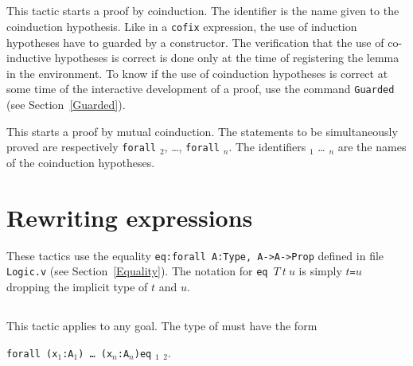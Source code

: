 \subsection{}
\label{tactic:cofix}

This tactic starts a proof by coinduction. The identifier {\ident} is
the name given to the coinduction hypothesis.  Like in a {\tt cofix}
expression, the use of induction hypotheses have to guarded by a
constructor.  The verification that the use of co-inductive hypotheses
is correct is done only at the time of registering the lemma in the
environment. To know if the use of coinduction hypotheses is correct
at some time of the interactive development of a proof, use the
command {\tt Guarded} (see Section~\ref{Guarded}).


\begin{Variants}
  \item {}

This starts a proof by mutual coinduction. The statements to be
simultaneously proved are respectively {\tt forall}
 {\type}$_2$, {\ldots}, {\tt forall}
   {\type}$_n$. The identifiers
    {\ident}$_1$ {\ldots} {\ident}$_n$ are the names of the
    coinduction hypotheses.

\end{Variants}

\section{Rewriting expressions}


These tactics use the equality {\tt eq:forall A:Type, A->A->Prop}
defined in file {\tt Logic.v} (see Section~\ref{Equality}). The
notation for {\tt eq}~$T~t~u$ is simply {\tt $t$=$u$} dropping the
implicit type of $t$ and $u$.

\subsection{}
\label{rewrite}

This tactic applies to any goal. The type of {\term}
must have the form

\texttt{forall (x$_1$:A$_1$) \dots\ (x$_n$:A$_n$)}\texttt{eq} \term$_1$ \term$_2$.

